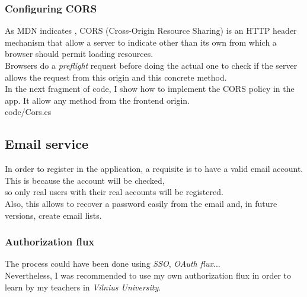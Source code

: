         \subsubsection{Configuring CORS}
    As MDN indicates \cite{CORS}, CORS (Cross-Origin Resource Sharing) is an HTTP header mechanism that allow a server to indicate other than its own from which a browser should permit loading resources. \\
    Browsers do a \textit{preflight} request before doing the actual one to check if the server allows the request from this origin and this concrete method. \\

    In the next fragment of code, I show how to implement the CORS policy in the app. It allow any method from the frontend origin. \\
    
    {code/Cors.cs}

    \subsection{Email service}
    In order to register in the application, a requisite is to have a valid email account. This is because the account will be checked, \\
    so only real users with their real accounts will be registered. \\

    Also, this allows to recover a password easily from the email and, in future versions, create email lists. \\

    \subsubsection{Authorization flux}
    The process could have been done using \textit{SSO}, \textit{OAuth flux}... \\
    Nevertheless, I was recommended to use my own authorization flux in order to learn by my teachers in \textit{Vilnius University}. \\

